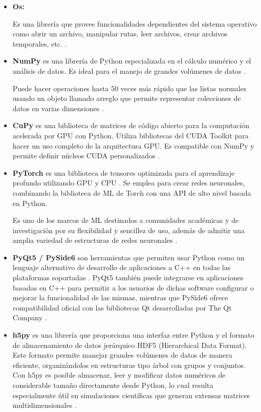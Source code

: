 \begin{itemize}
	
	\item \textbf{Os:}
	
	Es una librería que provee funcionalidades dependientes del sistema operativo como abrir un archivo, manipular rutas, leer archivos, crear archivos temporales, etc. \cite{pythonOS}.

	\item\textbf{NumPy} es una librería de Python especializada en el cálculo numérico y el análisis de datos. Es ideal para el manejo de grandes volúmenes de datos \cite{alfaro_numpy}.

	Puede hacer operaciones hasta 50 veces más rápido que las listas normales usando un objeto llamado arreglo que permite representar colecciones de datos en varias dimensiones \cite{alfaro_numpy}.
	
	\item \textbf{CuPy} es una biblioteca de matrices de código abierto para la computación acelerada por GPU con Python. Utiliza bibliotecas del CUDA Toolkit para hacer un uso completo de la arquitectura GPU. Es compatible con NumPy y permite definir núcleos CUDA personalizados \cite{cupy}. 
	
	\item\textbf{PyTorch} es una biblioteca de tensores optimizada para el aprendizaje profundo utilizando GPU y CPU \cite{pytorch_1}. Se emplea para crear redes neuronales, combinando la biblioteca de ML de Torch con una API de alto nivel basada en Python. 

	Es uno de los marcos de ML destinados a comunidades académicas y de investigación por su flexibilidad y sencillez de uso, además de admitir una amplia variedad de estructuras de redes neuronales \cite{pytorch_2}.
	
	\item \textbf{PyQt5 / PySide6} son herramientas que permiten usar Python como un lenguaje alternativo de desarrollo de aplicaciones a C++ en todas las plataformas soportadas \cite{qt_1}. PyQt5 también puede integrarse en aplicaciones basadas en C++ para permitir a los usuarios de dichas software configurar o mejorar la funcionalidad de las mismas, mientras que PySide6 ofrece compatibilidad oficial con las bibliotecas Qt desarrolladas por The Qt Company \cite{qt_2}.

	\item \textbf{h5py} es una librería que proporciona una interfaz entre Python y el formato de almacenamiento de datos jerárquico HDF5 (Hierarchical Data Format). Este formato permite manejar grandes volúmenes de datos de manera eficiente, organizándolos en estructuras tipo árbol con grupos y conjuntos. Con h5py es posible almacenar, leer y modificar datos numéricos de considerable tamaño directamente desde Python, lo cual resulta especialmente útil en simulaciones científicas que generan extensas matrices multidimensionales \cite{h5py}.


\end{itemize}
